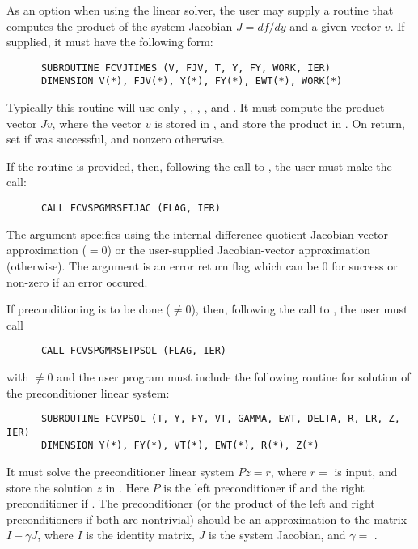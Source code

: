 \begin{Steps}
\begin{itemize}
       
    As an option when using the  linear solver, the user may supply a 
    routine that computes the product of the system Jacobian $J = df/dy$ and 
    a given vector $v$.  If supplied, it must have the following form:
\begin{verbatim}
      SUBROUTINE FCVJTIMES (V, FJV, T, Y, FY, WORK, IER)
      DIMENSION V(*), FJV(*), Y(*), FY(*), EWT(*), WORK(*)
\end{verbatim}
    Typically this routine will use only , , , , and .
    It must compute the product vector $Jv$, where the vector $v$ is stored in , 
    and store the product in .  On return, set  if 
    was successful, and nonzero otherwise.

    If the  routine is provided, then, 
    following the call to , the user must make the call:
\begin{verbatim}
      CALL FCVSPGMRSETJAC (FLAG, IER)
\end{verbatim}
    The argument  specifies using the {\cvode} internal difference-quotient 
    Jacobian-vector approximation ($=0$) or the user-supplied Jacobian-vector
    approximation (otherwise). 
    The argument  is an error return flag which can be $0$ 
    for success or non-zero if an error occured.

    If preconditioning is to be done ($\neq 0$), then, following the call 
    to , the user must call
\begin{verbatim}
      CALL FCVSPGMRSETPSOL (FLAG, IER)
\end{verbatim}
    with $\neq 0$ and the user program must include the following routine 
    for solution of the preconditioner linear system:
\begin{verbatim}
      SUBROUTINE FCVPSOL (T, Y, FY, VT, GAMMA, EWT, DELTA, R, LR, Z, IER)
      DIMENSION Y(*), FY(*), VT(*), EWT(*), R(*), Z(*)
\end{verbatim}
    It must solve the preconditioner linear system $Pz = r$, where $r =$  
    is input, and store the solution $z$ in . Here $P$ is the left 
    preconditioner if  and the right preconditioner if .  
    The preconditioner (or the product of the left and right preconditioners 
    if both are nontrivial) should be an  approximation to the matrix 
    $I - \gamma J$, where $I$ is the identity matrix, $J$ is the system Jacobian,
    and $\gamma =$ .
    

\end{itemize}
\end{Steps}

